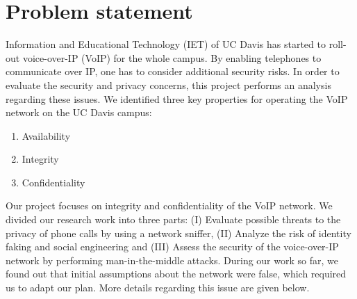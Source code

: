 \section{Problem statement}

Information and Educational Technology (IET) of UC Davis has started to roll-out voice-over-IP (VoIP) for the whole campus. By enabling telephones to communicate over IP, one has to consider additional security risks. In order to evaluate the security and privacy concerns, this project performs an analysis regarding these issues. We identified three key properties for operating the VoIP network on the UC Davis campus:

\begin{enumerate}
\item Availability
\item Integrity
\item Confidentiality
\end{enumerate}

Our project focuses on integrity and confidentiality of the VoIP network. We divided our research work into three parts: (I) Evaluate possible threats to the privacy of phone calls by using a network sniffer, (II) Analyze the risk of identity faking and social engineering and (III) Assess the security of the voice-over-IP network by performing man-in-the-middle attacks. During our work so far, we found out that initial assumptions about the network were false, which required us to adapt our plan. More details regarding this issue are given below.